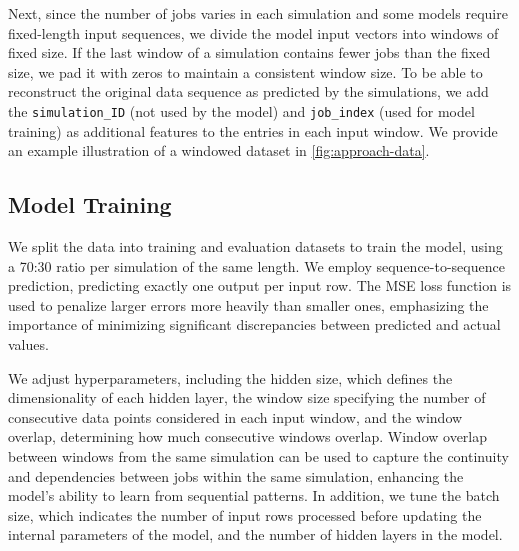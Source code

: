 Next, since the number of jobs varies in each simulation and some models require fixed-length input sequences, we divide the model input vectors into windows of fixed size. 
%
If the last window of a simulation contains fewer jobs than the fixed size, we pad it with zeros to maintain a consistent window size. 
%
To be able to reconstruct the original data sequence as predicted by the simulations, we add the \texttt{simulation\_ID} (not used by the model) and \texttt{job\_index} (used for model training) as additional features to the entries in each input window.
%
We provide an example illustration of a windowed dataset in \autoref{fig:approach-data}. 


\subsection{Model Training} \label{sec:approach:training}

We split the data into training and evaluation datasets to train the model, using a 70:30 ratio per simulation of the same length. 
%
We employ sequence-to-sequence prediction, predicting exactly one output per input row. 
%
%
%
%
The MSE loss function is used to penalize larger errors more heavily than smaller ones, emphasizing the importance of minimizing significant discrepancies between predicted and actual values.


We adjust hyperparameters, including the hidden size, which defines the dimensionality of each hidden layer, the window size specifying the number of consecutive data points considered in each input window, and the window overlap, determining how much consecutive windows overlap. 
%
Window overlap between windows from the same simulation can be used to capture the continuity and dependencies between jobs within the same simulation, enhancing the model's ability to learn from sequential patterns. 
%
In addition, we tune the batch size, which indicates the number of input rows processed before updating the internal parameters of the model, and the number of hidden layers in the model.


